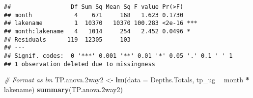 \documentclass[]{article}
\newenvironment{Shaded}{\begin{snugshade}}{\end{snugshade}}
\newcommand{\CommentTok}[1]{\textcolor[rgb]{0.56,0.35,0.01}{\textit{#1}}}
\newcommand{\DataTypeTok}[1]{\textcolor[rgb]{0.13,0.29,0.53}{#1}}
\newcommand{\FloatTok}[1]{\textcolor[rgb]{0.00,0.00,0.81}{#1}}
\newcommand{\KeywordTok}[1]{\textcolor[rgb]{0.13,0.29,0.53}{\textbf{#1}}}
\newcommand{\NormalTok}[1]{#1}
\newcommand{\OperatorTok}[1]{\textcolor[rgb]{0.81,0.36,0.00}{\textbf{#1}}}
\newcommand{\StringTok}[1]{\textcolor[rgb]{0.31,0.60,0.02}{#1}}
\begin{document}
\begin{Shaded}
\end{Shaded}

\begin{verbatim}
##                 Df Sum Sq Mean Sq F value Pr(>F)    
## month            4    671     168   1.623 0.1730    
## lakename         1  10370   10370 100.283 <2e-16 ***
## month:lakename   4   1014     254   2.452 0.0496 *  
## Residuals      119  12305     103                   
## ---
## Signif. codes:  0 '***' 0.001 '**' 0.01 '*' 0.05 '.' 0.1 ' ' 1
## 1 observation deleted due to missingness
\end{verbatim}

\begin{Shaded}
\begin{Highlighting}[]
\CommentTok{# Format as lm}
\NormalTok{TP.anova}\FloatTok{.2}\NormalTok{way2 <-}\StringTok{ }\KeywordTok{lm}\NormalTok{(}\DataTypeTok{data =}\NormalTok{ Depths.Totals, tp_ug }\OperatorTok{~}\StringTok{ }\NormalTok{month }\OperatorTok{*}\StringTok{ }\NormalTok{lakename)}
\KeywordTok{summary}\NormalTok{(TP.anova}\FloatTok{.2}\NormalTok{way2)}
\end{Highlighting}
\end{Shaded}
\end{document}
